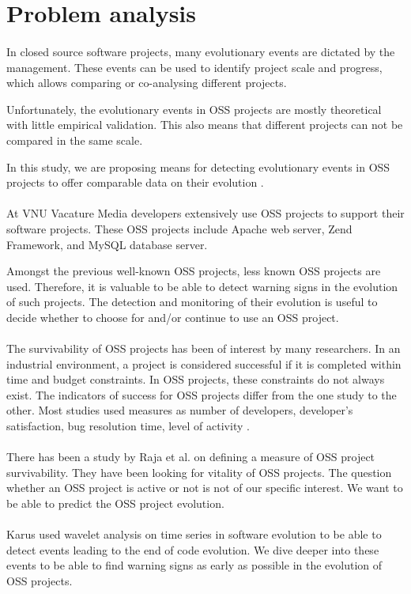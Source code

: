 \section{Problem analysis}
\paragraph{}
In closed source software projects, many evolutionary events are dictated by the
management. These events can be used to identify project scale and progress,
which allows comparing or co-analysing different projects.

Unfortunately, the evolutionary events in OSS projects are mostly theoretical
with little empirical validation. This also means that different projects can
not be compared in the same scale.

In this study, we are proposing means for detecting evolutionary events in OSS
projects to offer comparable data on their evolution \cite{karus2013}.

\paragraph{}
At VNU Vacature Media developers extensively use OSS projects to support their
software projects. These OSS projects include Apache web server, Zend Framework,
and MySQL database server.

Amongst the previous well-known OSS projects, less known OSS projects are used.
Therefore, it is valuable to be able to detect warning signs in the
evolution of such projects. The detection and monitoring of their evolution is
useful to decide whether to choose for and/or continue to use an OSS project.

\paragraph{}
The survivability of OSS projects has been of interest by many researchers. In
an industrial environment, a project is considered successful if it is completed
within time and budget constraints. In OSS projects, these constraints do not
always exist. The indicators of success for OSS projects differ from the one
study to the other. Most studies used measures as number of developers,
developer's satisfaction, bug resolution time, level of activity
\cite{samoladas2010}.

\paragraph{}
There has been a study by Raja et al. \cite{raja2012} on defining a measure of
OSS project survivability. They have been looking for vitality of OSS projects.
The question whether an OSS project is active or not is not of our specific
interest. We want to be able to predict the OSS project evolution.

\paragraph{}
Karus used wavelet analysis on time series in software evolution to be able to
detect events leading to the end of code evolution. We dive deeper into these
events to be able to find warning signs as early as possible in the evolution of
OSS projects.
